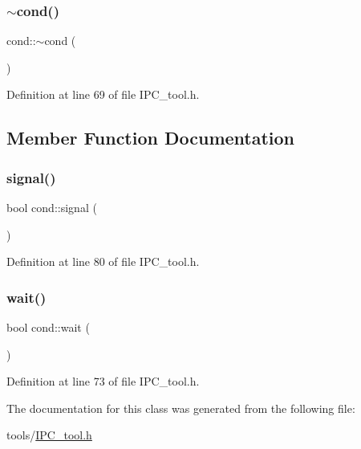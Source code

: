 \mbox{\label{classcond_ab33755bcd72bcd35d42853c4b9c05902}} 
\subsubsection{\texorpdfstring{$\sim$cond()}{~cond()}}
{\footnotesize\ttfamily cond\+::$\sim$cond (\begin{DoxyParamCaption}{ }\end{DoxyParamCaption})\hspace{0.3cm}{\ttfamily [inline]}}



Definition at line 69 of file I\+P\+C\+\_\+tool.\+h.



\subsection{Member Function Documentation}
\mbox{\label{classcond_a29d17ca3d304fbce1d4abe3a335b7a6a}} 
\subsubsection{\texorpdfstring{signal()}{signal()}}
{\footnotesize\ttfamily bool cond\+::signal (\begin{DoxyParamCaption}{ }\end{DoxyParamCaption})\hspace{0.3cm}{\ttfamily [inline]}}



Definition at line 80 of file I\+P\+C\+\_\+tool.\+h.

\mbox{\label{classcond_ae495616f19927b2a063e5be336cbe610}} 
\subsubsection{\texorpdfstring{wait()}{wait()}}
{\footnotesize\ttfamily bool cond\+::wait (\begin{DoxyParamCaption}{ }\end{DoxyParamCaption})\hspace{0.3cm}{\ttfamily [inline]}}



Definition at line 73 of file I\+P\+C\+\_\+tool.\+h.



The documentation for this class was generated from the following file\+:\begin{DoxyCompactItemize}
\item 
tools/\hyperlink{_i_p_c__tool_8h}{I\+P\+C\+\_\+tool.\+h}\end{DoxyCompactItemize}
